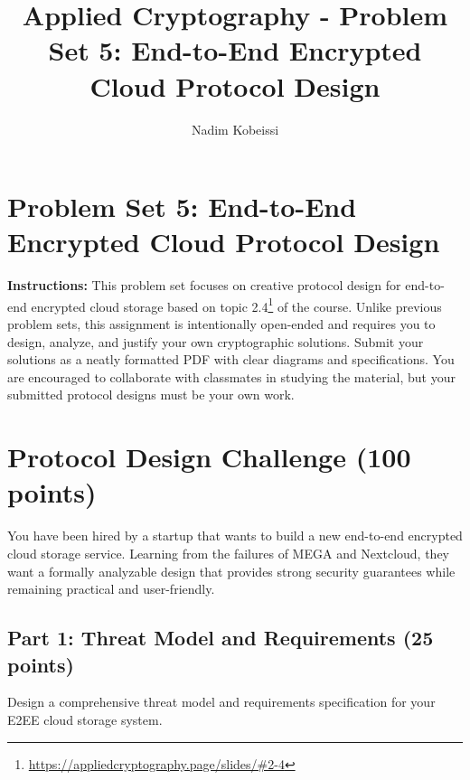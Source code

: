 \documentclass[10pt,a4paper,american]{exam}
\title{Applied Cryptography - Problem Set 5: End-to-End Encrypted Cloud Protocol Design}
\author{Nadim Kobeissi}
\begin{document}
\classhandoutheader
\section*{Problem Set 5: End-to-End Encrypted Cloud Protocol Design}

\begin{tcolorbox}[colframe=OliveGreen!30!white,colback=OliveGreen!5!white]
	\textbf{Instructions:} This problem set focuses on creative protocol design for end-to-end encrypted cloud storage based on topic 2.4\footnote{\url{https://appliedcryptography.page/slides/\#2-4}} of the course. Unlike previous problem sets, this assignment is intentionally open-ended and requires you to design, analyze, and justify your own cryptographic solutions. Submit your solutions as a neatly formatted PDF with clear diagrams and specifications. You are encouraged to collaborate with classmates in studying the material, but your submitted protocol designs must be your own work.
\end{tcolorbox}

\section{Protocol Design Challenge (100 points)}

You have been hired by a startup that wants to build a new end-to-end encrypted cloud storage service. Learning from the failures of MEGA and Nextcloud, they want a formally analyzable design that provides strong security guarantees while remaining practical and user-friendly.

\subsection{Part 1: Threat Model and Requirements (25 points)}

Design a comprehensive threat model and requirements specification for your E2EE cloud storage system.
\end{document}
